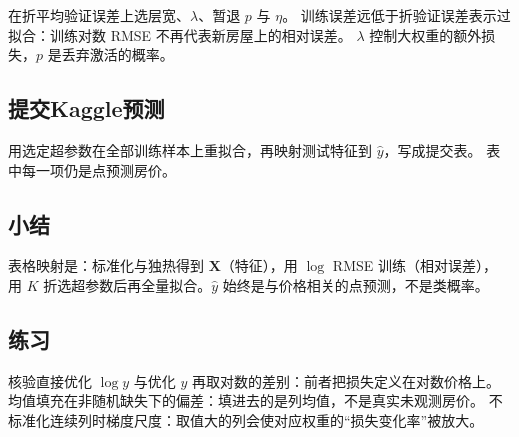 在折平均验证误差上选层宽、$\lambda$、暂退 $p$ 与 $\eta$。
训练误差远低于折验证误差表示过拟合：训练对数 RMSE 不再代表新房屋上的相对误差。
$\lambda$ 控制大权重的额外损失，$p$ 是丢弃激活的概率。

\subsection{提交Kaggle预测}

用选定超参数在全部训练样本上重拟合，再映射测试特征到 $\hat{y}$，写成提交表。
表中每一项仍是点预测房价。

\subsection{小结}

表格映射是：标准化与独热得到 $\bm{X}$（特征），用 $\log$ RMSE 训练（相对误差），
用 $K$ 折选超参数后再全量拟合。$\hat{y}$ 始终是与价格相关的点预测，不是类概率。

\subsection{练习}

核验直接优化 $\log y$ 与优化 $y$ 再取对数的差别：前者把损失定义在对数价格上。
均值填充在非随机缺失下的偏差：填进去的是列均值，不是真实未观测房价。
不标准化连续列时梯度尺度：取值大的列会使对应权重的“损失变化率”被放大。
